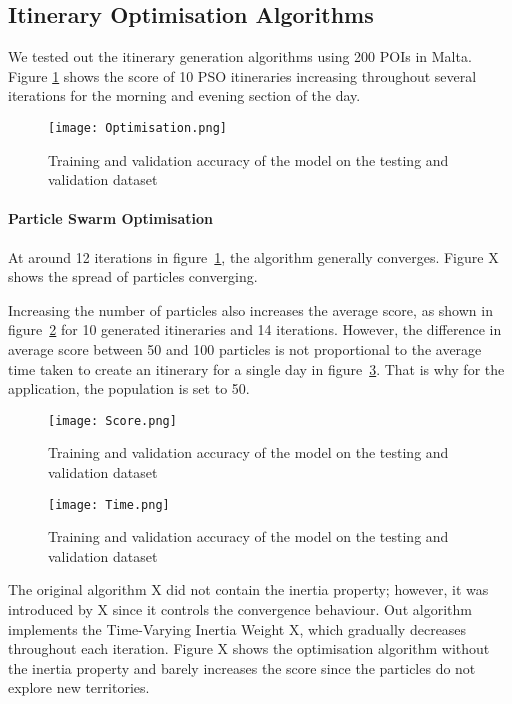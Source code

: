 \subsection{Itinerary Optimisation Algorithms}

We tested out the itinerary generation algorithms using 200 POIs in Malta. 
Figure \ref{optimise} shows the score of 10
PSO itineraries increasing throughout several
iterations for the morning and evening section of the
day.

\begin{figure}[h]
\centering
\texttt{[image: Optimisation.png]}
\caption{Training and validation accuracy of the model on the testing and validation dataset}
\label{optimise}
\end{figure}

\paragraph{Particle Swarm Optimisation}
 At around 12 iterations in figure~\ref{optimise}, the
algorithm generally converges. Figure X shows the
spread of particles converging. 


Increasing the number of particles also increases the
average score, as shown in figure~\ref{score} for 10 generated
itineraries and 14 iterations. However, the difference
in average score between 50 and 100 particles is not
proportional to the average time taken to create an
itinerary for a single day in figure~\ref{time}.  That is why
for the application, the population is set to 50. 

\begin{figure}[h]
\centering
\texttt{[image: Score.png]}
\caption{Training and validation accuracy of the model on the testing and validation dataset}
\label{score}
\end{figure}

\begin{figure}[h]
\centering
\texttt{[image: Time.png]}
\caption{Training and validation accuracy of the model on the testing and validation dataset}
\label{time}
\end{figure}

The original algorithm X did not contain the inertia
property; however, it was introduced by X since it
controls the convergence behaviour. Out algorithm
implements the Time-Varying Inertia Weight X, which
gradually decreases throughout each iteration. Figure
X shows the optimisation algorithm without the inertia
property and barely increases the score since the
particles do not explore new territories.
